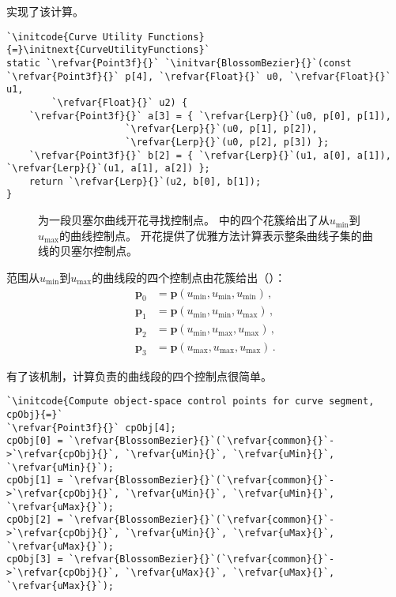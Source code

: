 实现了该计算。
\begin{lstlisting}
`\initcode{Curve Utility Functions}{=}\initnext{CurveUtilityFunctions}`
static `\refvar{Point3f}{}` `\initvar{BlossomBezier}{}`(const `\refvar{Point3f}{}` p[4], `\refvar{Float}{}` u0, `\refvar{Float}{}` u1,
        `\refvar{Float}{}` u2) {
    `\refvar{Point3f}{}` a[3] = { `\refvar{Lerp}{}`(u0, p[0], p[1]),
                     `\refvar{Lerp}{}`(u0, p[1], p[2]),
                     `\refvar{Lerp}{}`(u0, p[2], p[3]) };
    `\refvar{Point3f}{}` b[2] = { `\refvar{Lerp}{}`(u1, a[0], a[1]), `\refvar{Lerp}{}`(u1, a[1], a[2]) };
    return `\refvar{Lerp}{}`(u2, b[0], b[1]);
}
\end{lstlisting}
\begin{figure}[htbp]
    \centering
    \caption{为一段贝塞尔曲线开花寻找控制点。
        \protect{}中的四个花簇给出了从$u_{\min}$到$u_{\max}$的曲线控制点。
        开花提供了优雅方法计算表示整条曲线子集的曲线的贝塞尔控制点。}
    \label{fig:3.19}
\end{figure}

范围从$u_{\min}$到$u_{\max}$的曲线段的四个控制点由花簇给出（）：
\begin{align}\label{eq:3.5}
    \bm p_0 & =\bm p(u_{\min},u_{\min},u_{\min})\nonumber\, , \\
    \bm p_1 & =\bm p(u_{\min},u_{\min},u_{\max})\nonumber\, , \\
    \bm p_2 & =\bm p(u_{\min},u_{\max},u_{\max})\nonumber\, , \\
    \bm p_3 & =\bm p(u_{\max},u_{\max},u_{\max})\, .
\end{align}

有了该机制，计算负责的曲线段的四个控制点很简单。
\begin{lstlisting}
`\initcode{Compute object-space control points for curve segment, cpObj}{=}`
`\refvar{Point3f}{}` cpObj[4];
cpObj[0] = `\refvar{BlossomBezier}{}`(`\refvar{common}{}`->`\refvar{cpObj}{}`, `\refvar{uMin}{}`, `\refvar{uMin}{}`, `\refvar{uMin}{}`);
cpObj[1] = `\refvar{BlossomBezier}{}`(`\refvar{common}{}`->`\refvar{cpObj}{}`, `\refvar{uMin}{}`, `\refvar{uMin}{}`, `\refvar{uMax}{}`);
cpObj[2] = `\refvar{BlossomBezier}{}`(`\refvar{common}{}`->`\refvar{cpObj}{}`, `\refvar{uMin}{}`, `\refvar{uMax}{}`, `\refvar{uMax}{}`);
cpObj[3] = `\refvar{BlossomBezier}{}`(`\refvar{common}{}`->`\refvar{cpObj}{}`, `\refvar{uMax}{}`, `\refvar{uMax}{}`, `\refvar{uMax}{}`);
\end{lstlisting}